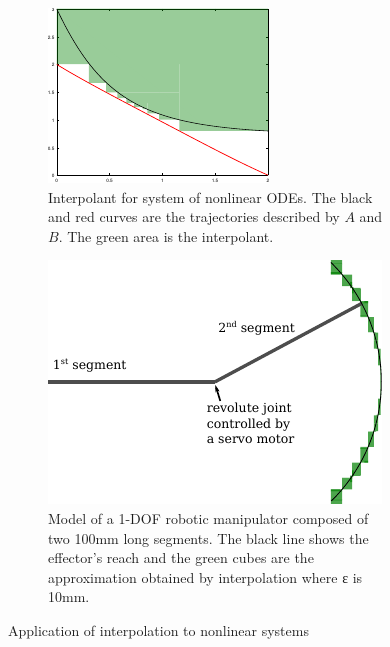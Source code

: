 \begin{figure}
\begin{subfigure}{0.45\textwidth}
  \centering
  \includegraphics[scale=1.5]{img/ode.pdf}
  \caption{ Interpolant for system of nonlinear ODEs. 
            The black and red curves are the trajectories described by $A$ and $B$.
            The green area is the interpolant.
            }
  \label{fig:ode}
\end{subfigure}
\hfill
\begin{subfigure}{0.5\textwidth}
  \centering
  \includegraphics[scale=1]{img/arm.pdf}
  \caption{
    Model of a 1-DOF robotic manipulator composed of two 100mm long segments.
    The black line shows the effector's reach and the green cubes are the approximation obtained by interpolation where ε is 10mm.
  }
  \label{fig:robot}
\end{subfigure}
\caption{Application of interpolation to nonlinear systems}
\end{figure}


